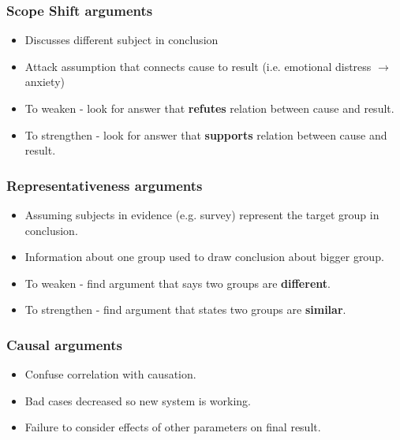 \documentclass[paper=a4]{article}
\begin{document}
\subsubsection{Scope Shift arguments}
\begin{itemize}
	\item Discusses different subject in conclusion
	\item Attack assumption that connects cause to result (i.e. emotional distress $\rightarrow$ anxiety)
	\item To weaken - look for answer that \textbf{refutes} relation between cause and result.
	\item To strengthen - look for answer that \textbf{supports} relation between cause and result.
\end{itemize}

\subsubsection{Representativeness arguments}
\begin{itemize}
	\item Assuming subjects in evidence (e.g. survey) represent the target group in conclusion.
	\item Information about one group used to draw conclusion about bigger group.
	\item To weaken - find argument that says two groups are \textbf{different}.
	\item To strengthen - find argument that states two groups are \textbf{similar}.
\end{itemize}

\subsubsection{Causal arguments}
\begin{itemize}
	\item Confuse correlation with causation.
	\item Bad cases decreased so new system is working.
	\item Failure to consider effects of other parameters on final result.
\end{itemize}
\end{document}
